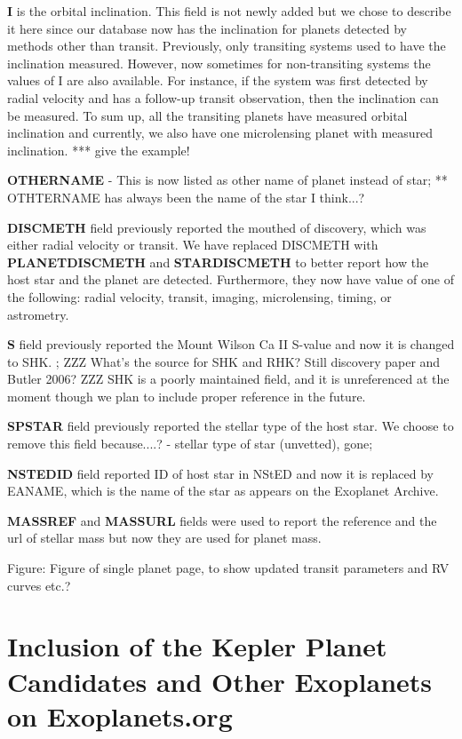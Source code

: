 \documentclass[11pt,preprint]{aastex}
\begin{document}
\begin{CJK*}{UTF8}{gbsn}
{\bf I} is the orbital inclination. This field is not newly added but we chose to describe it here since our database now has the inclination for planets detected by methods other than transit. Previously, only transiting systems used to have the inclination measured. However, now sometimes for
non-transiting systems the values of I are also available. For instance, if the system was first detected by radial velocity and has a follow-up transit observation, then the inclination can be measured. To sum up, all the transiting planets have measured orbital inclination and currently, we also have one microlensing planet with measured inclination. *** give the example!


{\bf OTHERNAME} - This is now listed as other name of planet instead of star;
** OTHTERNAME has always been the name of the star I think...?

{\bf DISCMETH} field previously reported the mouthed of discovery, which was either radial velocity or transit. We have replaced DISCMETH with {\bf PLANETDISCMETH} and {\bf STARDISCMETH} to better report how the host star and the planet are detected. Furthermore, they now have value of one of the following: radial velocity, transit, imaging, microlensing, timing, or astrometry.  

{\bf S} field previously reported the Mount Wilson Ca II S-value and now it is changed to SHK. 
; ZZZ What's the source for SHK and RHK? Still discovery paper and Butler 2006? ZZZ SHK is a poorly maintained field, and it is unreferenced at the moment though we plan to include proper reference
in the future.

{\bf SPSTAR} field previously reported the stellar type of the host star. We choose to remove this field because....? - stellar type of star (unvetted), gone;

{\bf NSTEDID} field reported ID of host star in NStED and now it is replaced by EANAME, which is the name of the star as appears on the Exoplanet Archive. 

{\bf MASSREF} and {\bf MASSURL} fields were used to report the reference and the url of stellar mass but now they are used for planet mass.

Figure: Figure of single planet page, to show updated transit
parameters and RV curves etc.?


\section{Inclusion of the Kepler Planet Candidates and Other Exoplanets on Exoplanets.org}\label{sec:kepler}


\end{CJK*}
\end{document}
